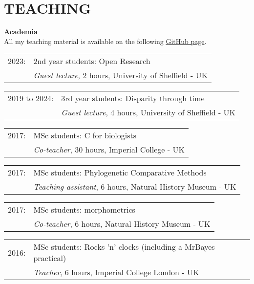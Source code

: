 \documentclass[10pt,a4paper]{article}
\begin{document}
{\section{TEACHING}
\bigskip

\raggedright\textbf{Academia}\\[1.5ex]
All my teaching material is available on the following \href{https://github.com/TGuillermeTeaching}{GitHub page}.

\begin{tabular}{ll}
2023: & 2nd year students: Open Research\\
      & \textit{Guest lecture}, 2 hours, University of Sheffield - UK \\
\end{tabular}

\begin{tabular}{ll}
2019 to 2024: & 3rd year students: Disparity through time\\
           & \textit{Guest lecture}, 4 hours, University of Sheffield - UK \\
\end{tabular}

\begin{tabular}{ll}
2017: & MSc students: C for biologists\\
      & \textit{Co-teacher}, 30 hours, Imperial College - UK \\
\end{tabular}

\begin{tabular}{ll}
2017: & MSc students: Phylogenetic Comparative Methods\\
      & \textit{Teaching assistant}, 6 hours, Natural History Museum - UK \\
\end{tabular}

\begin{tabular}{ll}
2017: & MSc students: morphometrics\\
      & \textit{Co-teacher}, 6 hours, Natural History Museum - UK \\
\end{tabular}

\begin{tabular}{ll}
2016: & MSc students: Rocks 'n' clocks (including a MrBayes practical)\\
      & \textit{Teacher}, 6 hours, Imperial College London - UK \\
\end{tabular}

}
\end{document}
